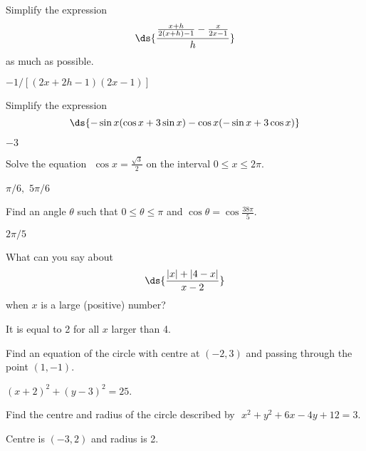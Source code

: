 \begin{enumialphparenastyle}
\begin{multicols}{2}
\begin{ex}
Simplify the expression \\
$$\ds{\frac{\frac{x+h}{2(x+h)-1}-\frac{x}{2x-1}}{h}}$$
 as much as possible.
\begin{sol}
	$-1/\left[(2x+2h-1)(2x-1)\right]$
\end{sol}
\end{ex}

\begin{ex}
Simplify the expression \\
$$\ds{-\sin x(\cos x+3\sin x)-\cos x(-\sin x+3\cos x)}$$
\begin{sol}
	$-3$
\end{sol}
\end{ex}

\begin{ex}
Solve the equation $\,\, \cos x=\frac{\sqrt{3}}{2}$ on
the interval $0\leq x\leq 2\pi$.
\begin{sol}
	$\pi /6,$ $5\pi /6$
\end{sol}
\end{ex}

\begin{ex}
Find an angle $\theta$ such that $0\leq\theta\leq\pi$ and $\cos\theta=\cos\frac{38\pi}{5}$.
\begin{sol}
	$2\pi/5$
\end{sol}
\end{ex}

\begin{ex}
What can you say about \\
$$\ds{\dfrac{\left\vert x\right\vert+\left\vert 4-x\right\vert}{x-2}} $$
 when $x$ is a large
(positive) number?
\begin{sol}
	It is equal to 2 for all $x$ larger than 4.
\end{sol}
\end{ex}

\begin{ex}
Find an equation of the circle with centre at $(-2,3)$ and passing through the point $(1,-1)$.
\begin{sol}
	$(x+2)^2+(y-3)^2=25$.
\end{sol}
\end{ex}

\begin{ex}
Find the centre and radius of the circle described
by $\,\,x^2+y^2+6x-4y+12=3$.
\begin{sol}
	Centre is $(-3,2)$ and radius is 2.
\end{sol}
\end{ex}


\end{multicols}
\end{enumialphparenastyle}
